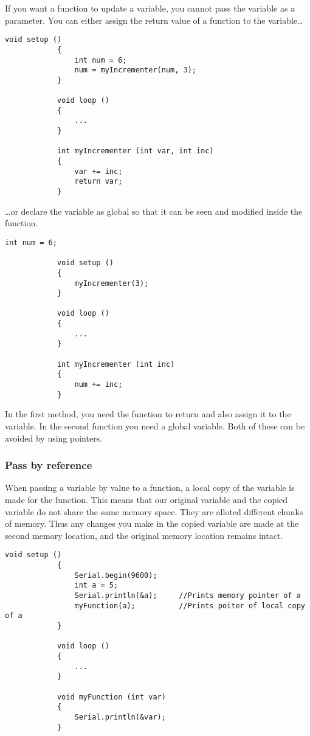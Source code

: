 \documentclass{article}
\begin{document}
			If you want a function to update a variable, you cannot pass the variable as a parameter. You can either assign the return value of a function to the variable\ldots

			\begin{lstlisting}[gobble=12]
			void setup ()
			{
				int num = 6;
				num = myIncrementer(num, 3);
			}

			void loop ()
			{
				...
			}

			int myIncrementer (int var, int inc)
			{
				var += inc;
				return var;
			}
			\end{lstlisting}

			\ldots{}or declare the variable as global so that it can be seen and modified inside the function.

			\begin{lstlisting}[gobble=12]
			int num = 6;
			
			void setup ()
			{
				myIncrementer(3);
			}

			void loop ()
			{
				...
			}

			int myIncrementer (int inc)
			{
				num += inc;
			}
			\end{lstlisting}

			In the first method, you need the function to return and also assign it to the variable. In the second function you need a global variable. Both of these can be avoided by using pointers.

		\subsubsection{Pass by reference}

			When passing a variable by value to a function, a local copy of the variable is made for the function. This means that our original variable and the copied variable do not share the same memory space. They are alloted different chunks of memory. Thus any changes you make in the copied variable are made at the second memory location, and the original memory location remains intact.

			\begin{lstlisting}[gobble=12]
			void setup ()
			{
				Serial.begin(9600);
				int a = 5;
				Serial.println(&a);		//Prints memory pointer of a
				myFunction(a);			//Prints poiter of local copy of a
			}

			void loop ()
			{
				...
			}

			void myFunction (int var)
			{
				Serial.println(&var);
			}
			\end{lstlisting}
\end{document}

